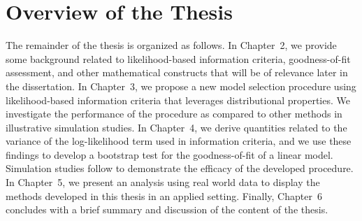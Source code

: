 		\section{Overview of the Thesis}
		The remainder of the thesis is organized as follows. In Chapter~2, we provide some background related to likelihood-based information criteria, goodness-of-fit assessment, and other mathematical
		constructs that will be of relevance later in the dissertation. In Chapter~3, we propose a new model selection procedure using likelihood-based information criteria that leverages distributional
		properties. We investigate the performance of the procedure as compared to other methods in illustrative simulation studies.  In Chapter~4, we derive quantities related to the variance of the
		log-likelihood term used in information criteria, and we use these findings to develop a bootstrap test for the goodness-of-fit of a linear model. Simulation studies follow to demonstrate the
		efficacy of the developed procedure. In Chapter~5, we present an analysis using real world data to display the methods developed in this thesis in an applied setting.
		Finally, Chapter~6 concludes with a brief summary and discussion of the content of the thesis. 
		